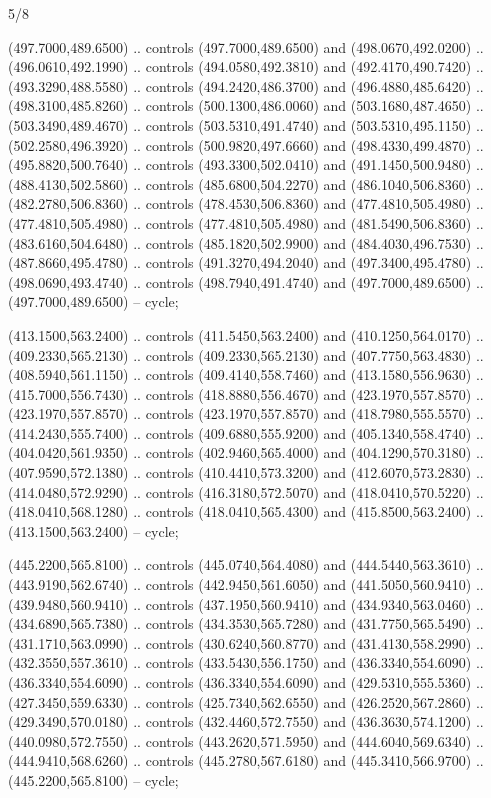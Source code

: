\begin{flagdescription}{5/8}
\begin{scope}[shift={(m)}]
\begin{scope}[scale=\flagwidth/220,y=0.1mm, x=0.1mm, yscale=-1,shift={(-596,-360)}]
\begin{scope}[draw=black,line join=round,line cap=round,line width=0.381\lw]
\begin{scope}[line width=0.534\lw,fill=green]
 (497.7000,489.6500) .. controls (497.7000,489.6500) and
  (498.0670,492.0200) .. (496.0610,492.1990) .. controls (494.0580,492.3810) and
  (492.4170,490.7420) .. (493.3290,488.5580) .. controls (494.2420,486.3700) and
  (496.4880,485.6420) .. (498.3100,485.8260) .. controls (500.1300,486.0060) and
  (503.1680,487.4650) .. (503.3490,489.4670) .. controls (503.5310,491.4740) and
  (503.5310,495.1150) .. (502.2580,496.3920) .. controls (500.9820,497.6660) and
  (498.4330,499.4870) .. (495.8820,500.7640) .. controls (493.3300,502.0410) and
  (491.1450,500.9480) .. (488.4130,502.5860) .. controls (485.6800,504.2270) and
  (486.1040,506.8360) .. (482.2780,506.8360) .. controls (478.4530,506.8360) and
  (477.4810,505.4980) .. (477.4810,505.4980) .. controls (477.4810,505.4980) and
  (481.5490,506.8360) .. (483.6160,504.6480) .. controls (485.1820,502.9900) and
  (484.4030,496.7530) .. (487.8660,495.4780) .. controls (491.3270,494.2040) and
  (497.3400,495.4780) .. (498.0690,493.4740) .. controls (498.7940,491.4740) and
  (497.7000,489.6500) .. (497.7000,489.6500) -- cycle;

 (413.1500,563.2400) .. controls (411.5450,563.2400) and
  (410.1250,564.0170) .. (409.2330,565.2130) .. controls (409.2330,565.2130) and
  (407.7750,563.4830) .. (408.5940,561.1150) .. controls (409.4140,558.7460) and
  (413.1580,556.9630) .. (415.7000,556.7430) .. controls (418.8880,556.4670) and
  (423.1970,557.8570) .. (423.1970,557.8570) .. controls (423.1970,557.8570) and
  (418.7980,555.5570) .. (414.2430,555.7400) .. controls (409.6880,555.9200) and
  (405.1340,558.4740) .. (404.0420,561.9350) .. controls (402.9460,565.4000) and
  (404.1290,570.3180) .. (407.9590,572.1380) .. controls (410.4410,573.3200) and
  (412.6070,573.2830) .. (414.0480,572.9290) .. controls (416.3180,572.5070) and
  (418.0410,570.5220) .. (418.0410,568.1280) .. controls (418.0410,565.4300) and
  (415.8500,563.2400) .. (413.1500,563.2400) -- cycle;

 (445.2200,565.8100) .. controls (445.0740,564.4080) and
  (444.5440,563.3610) .. (443.9190,562.6740) .. controls (442.9450,561.6050) and
  (441.5050,560.9410) .. (439.9480,560.9410) .. controls (437.1950,560.9410) and
  (434.9340,563.0460) .. (434.6890,565.7380) .. controls (434.3530,565.7280) and
  (431.7750,565.5490) .. (431.1710,563.0990) .. controls (430.6240,560.8770) and
  (431.4130,558.2990) .. (432.3550,557.3610) .. controls (433.5430,556.1750) and
  (436.3340,554.6090) .. (436.3340,554.6090) .. controls (436.3340,554.6090) and
  (429.5310,555.5360) .. (427.3450,559.6330) .. controls (425.7340,562.6550) and
  (426.2520,567.2860) .. (429.3490,570.0180) .. controls (432.4460,572.7550) and
  (436.3630,574.1200) .. (440.0980,572.7550) .. controls (443.2620,571.5950) and
  (444.6040,569.6340) .. (444.9410,568.6260) .. controls (445.2780,567.6180) and
  (445.3410,566.9700) .. (445.2200,565.8100) -- cycle;


\end{scope}
\end{scope}
\end{scope}
\end{scope}
\end{flagdescription}
